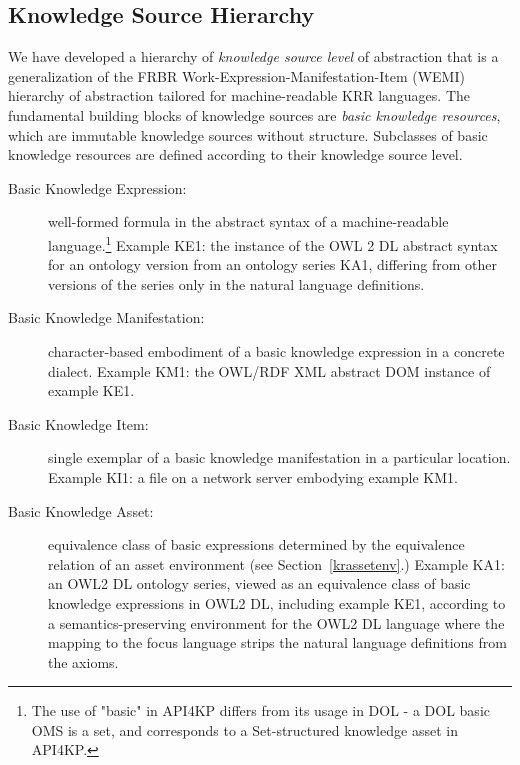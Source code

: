 \documentclass[runningheads]{llncs}
\begin{document}

\subsection{Knowledge Source Hierarchy}
We have developed a hierarchy of \emph{knowledge source level} of abstraction that is a generalization of the FRBR \cite{FRBR} Work-Expression-Manifestation-Item (WEMI) hierarchy of abstraction tailored for machine-readable KRR languages. The fundamental building blocks of knowledge sources are \emph{basic knowledge resources}, which are immutable knowledge sources without structure.
Subclasses of basic knowledge resources are defined according to their knowledge source level. 
\begin{description}
\item[Basic Knowledge Expression:] well-formed formula in the abstract syntax of a machine-readable language.\footnote{The use of "basic" in API4KP differs from its usage in DOL - a DOL basic OMS is a set, and corresponds to a Set-structured knowledge asset in API4KP.}
Example KE1: the instance of the OWL 2 DL abstract syntax for an ontology version from an ontology series KA1, differing from other versions of the series only in the natural language definitions.
\item[Basic Knowledge Manifestation:] character-based embodiment of a basic knowledge expression in a concrete dialect. Example KM1: the OWL/RDF XML abstract DOM instance of example KE1.
\item[Basic Knowledge Item:] single exemplar of a basic knowledge manifestation in a particular location. Example KI1: a file on a network server embodying example KM1.
\item[Basic Knowledge Asset:] equivalence class of basic expressions determined by the equivalence relation of an asset environment (see Section~\ref{krassetenv}.) Example KA1: an OWL2 DL ontology series, viewed as an equivalence class of basic knowledge expressions in OWL2 DL, including example KE1, according to a semantics-preserving environment for the OWL2 DL language where the mapping to the focus language strips the natural language definitions from the axioms.
\end{description}
\end{document}
